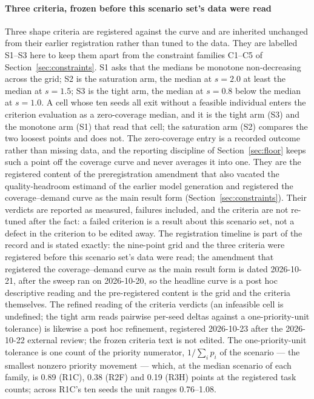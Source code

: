\documentclass[preprint,authoryear]{elsarticle}
\begin{document}
\paragraph{Three criteria, frozen before this scenario set's data were read} Three shape criteria are registered against the curve and are inherited unchanged from their earlier registration rather than tuned to the data. They are labelled S1--S3 here to keep them apart from the constraint families C1--C5 of Section~\ref{sec:constraints}. S1 asks that the medians be monotone non-decreasing across the grid; S2 is the saturation arm, the median at $s=2.0$ at least the median at $s=1.5$; S3 is the tight arm, the median at $s=0.8$ below the median at $s=1.0$. A cell whose ten seeds all exit without a feasible individual enters the criterion evaluation as a zero-coverage median, and it is the tight arm (S3) and the monotone arm (S1) that read that cell; the saturation arm (S2) compares the two loosest points and does not. The zero-coverage entry is a recorded outcome rather than missing data, and the reporting discipline of Section~\ref{sec:floor} keeps such a point off the coverage curve and never averages it into one. They are the registered content of the preregistration amendment that also vacated the quality-headroom estimand of the earlier model generation and registered the coverage--demand curve as the main result form (Section~\ref{sec:constraints}). Their verdicts are reported as measured, failures included, and the criteria are not re-tuned after the fact: a failed criterion is a result about this scenario set, not a defect in the criterion to be edited away. The registration timeline is part of the record and is stated exactly: the nine-point grid and the three criteria were registered before this scenario set's data were read; the amendment that registered the coverage--demand curve as the main result form is dated 2026-10-21, after the sweep ran on 2026-10-20, so the headline curve is a post hoc descriptive reading and the pre-registered content is the grid and the criteria themselves. The refined reading of the criteria verdicts (an infeasible cell is undefined; the tight arm reads pairwise per-seed deltas against a one-priority-unit tolerance) is likewise a post hoc refinement, registered 2026-10-23 after the 2026-10-22 external review; the frozen criteria text is not edited. The one-priority-unit tolerance is one count of the priority numerator, $1/\sum_i p_i$ of the scenario --- the smallest nonzero priority movement --- which, at the median scenario of each family, is 0.89 (R1C), 0.38 (R2F) and 0.19 (R3H) points at the registered task counts; across R1C's ten seeds the unit ranges 0.76--1.08.
\end{document}
